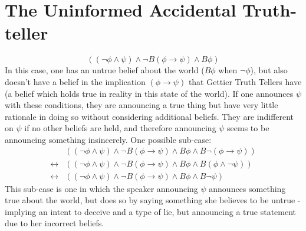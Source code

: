 \documentclass[12pt, titlepage, twoside, a4paper]{report}
\begin{document}
{\section{The Uninformed Accidental Truth-teller}
$$((\neg \phi \wedge \psi) \wedge \neg B(\phi \to \psi) \wedge B \phi)$$
In this case, one has an untrue belief about the world ($B\phi$ when $\neg \phi$), but also doesn't have a belief in the implication $(\phi \to \psi)$ that Gettier Truth Tellers have (a belief which holds true in reality in this state of the world). If one announces $\psi$ with these conditions, they are announcing a true thing but have very little rationale in doing so without considering additional beliefs. They are indifferent on $\psi$ if no other beliefs are held, and therefore announcing $\psi$ seems to be announcing something insincerely. One possible sub-case:
\begin{align*}
&((\neg \phi \wedge \psi) \wedge \neg B(\phi \to \psi) \wedge B \phi \wedge B \neg (\phi \to \psi ))\\
\leftrightarrow &((\neg \phi \wedge \psi) \wedge \neg B(\phi \to \psi) \wedge B \phi \wedge B (\phi \wedge \neg \psi ))\\
\leftrightarrow &((\neg \phi \wedge \psi) \wedge \neg B(\phi \to \psi) \wedge B \phi \wedge B \neg \psi)
\end{align*}
This sub-case is one in which the speaker announcing $\psi$ announces something true about the world, but does so by saying something she believes to be untrue - implying an intent to deceive and a type of lie, but announcing a true statement due to her incorrect beliefs. 

}
\end{document}
